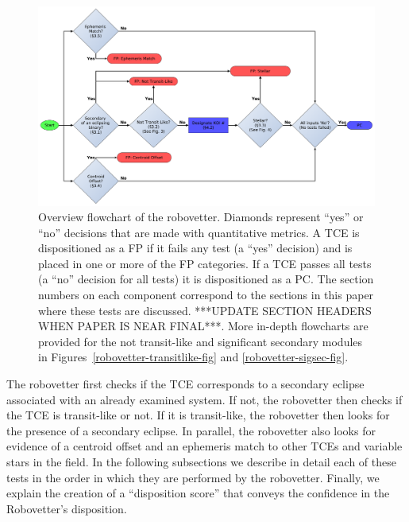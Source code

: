 \begin{figure}[ht]
\centering
\includegraphics[width=\linewidth]{RoboVetter-Diagram-V4-Overview.pdf}
\caption{Overview flowchart of the robovetter. Diamonds represent ``yes'' or ``no'' decisions that are made with quantitative metrics. A TCE is dispositioned as a FP if it fails any test (a ``yes'' decision) and is placed in one or more of the FP categories. If a TCE passes all tests (a ``no'' decision for all tests) it is dispositioned as a PC. The section numbers on each component correspond to the sections in this paper where these tests are discussed. ***UPDATE SECTION HEADERS WHEN PAPER IS NEAR FINAL***. More in-depth flowcharts are provided for the not transit-like and significant secondary modules in Figures~\ref{robovetter-transitlike-fig} and \ref{robovetter-sigsec-fig}.}
\label{robovetter-overview-fig}
\end{figure}


The robovetter first checks if the TCE corresponds to a secondary eclipse associated with an already examined system. If not, the robovetter then checks if the TCE is transit-like or not. If it is transit-like, the robovetter then looks for the presence of a secondary eclipse. In parallel, the robovetter also looks for evidence of a centroid offset and an ephemeris match to other TCEs and variable stars in the \kepler{} field. In the following subsections we describe in detail each of these tests in the order in which they are performed by the robovetter. Finally, we explain the creation of a ``disposition score'' that conveys the confidence in the Robovetter's disposition.


